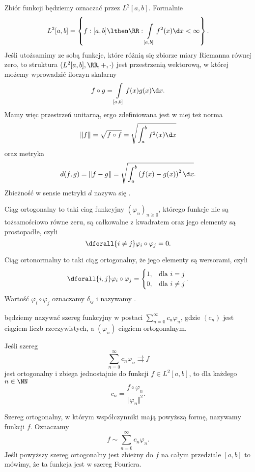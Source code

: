 Zbiór funkcji  będziemy oznaczać przez $L^2[a, b]$. Formalnie
\[ L^2[a, b] = \left\{f: [a, b] \lthen \RR : \int\limits_{[a, b]} f^2(x) \d x < \infty \right\}. \]
Jeśli utożsamimy ze sobą funkcje, które różnią się zbiorze miary Riemanna równej zero, to struktura $(L^2[a, b], \RR, +, \cdot)$ jest przestrzenią wektorową, w której możemy wprowadzić iloczyn skalarny
\[ f \circ g = \int\limits_{[a, b]} f(x)g(x) \d x. \]
Mamy więc przestrzeń unitarną, ergo zdefiniowana jest w niej też norma
\[ \Vert f \Vert = \sqrt{f \circ f} = \sqrt{\int_a^b f^2(x) \d x} \]
oraz metryka
\[ d(f, g) = \Vert f - g \Vert = \sqrt{\int_a^b \left(f(x) - g(x)\right)^2 \d x}. \]
Zbieżność w sensie metryki $d$ nazywa się .

\begin{definition}
    Ciąg ortogonalny to taki ciag funkcyjny $(\varphi_n)_{n\geq 0}$, którego funkcje nie są tożsamościowo równe zeru, są całkowalne z kwadratem oraz jego elementy są prostopadłe, czyli
    \[ \dforall{i \neq j} \varphi_i \circ \varphi_j = 0. \]
\end{definition}

\begin{definition}
    Ciąg ortonormalny to taki ciąg ortogonalny, że jego elementy są wersorami, czyli
    \[ \dforall{i, j} \varphi_i \circ \varphi_j = \begin{cases}1, & \text{dla } i = j \\ 0, & \text{dla } i \neq j\end{cases}. \]
    Wartość $\varphi_i \circ \varphi_j$ oznaczamy $\delta_{ij}$ i nazywamy .
\end{definition}

 będziemy nazywać szereg funkcyjny w postaci $\sum_{n=0}^\infty c_n\varphi_n$, gdzie $(c_n)$ jest ciągiem liczb rzeczywistych, a $(\varphi_n)$ ciągiem ortogonalnym.

\begin{theorem}
    \label{t:Euler-Fourier}
    Jeśli szereg
    \[ \sum_{n=0}^\infty c_n\varphi_n \rightrightarrows f \]
    jest ortogonalny i zbiega jednostajnie do funkcji $f \in L^2[a, b]$, to dla każdego $n \in \NN$
    \[ c_n = \frac{f \circ \varphi_n}{\Vert \varphi_n \Vert^2}. \]
\end{theorem}

Szereg ortogonalny, w którym współczynniki mają powyższą formę, nazywamy  funkcji $f$. Oznaczamy
\[ f \sim \sum_{n=0}^\infty c_n\varphi_n. \]
Jeśli powyższy szereg ortogonalny jest zbieżny do $f$ na całym przedziale $[a, b]$ to mówimy, że ta funkcja jest  w szereg Fouriera.

